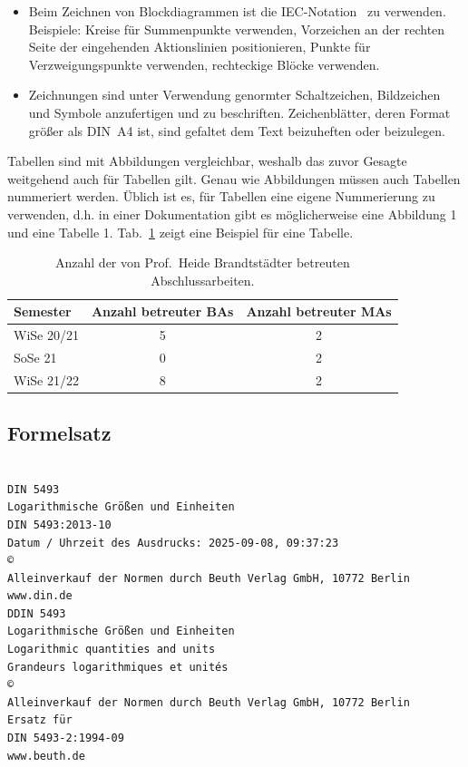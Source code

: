 \begin{itemize}
    \item Beim Zeichnen von Blockdiagrammen ist die IEC-Notation~\cite{IECControltech} zu verwenden. Beispiele: Kreise für Summenpunkte verwenden, Vorzeichen an der rechten Seite der eingehenden Aktionslinien positionieren, Punkte für Verzweigungspunkte verwenden, rechteckige Blöcke verwenden.
    \item Zeichnungen sind unter Verwendung genormter Schaltzeichen, Bildzeichen und Symbole anzufertigen und zu beschriften. Zeichenblätter, deren Format größer als DIN~A4 ist, sind gefaltet dem Text beizuheften oder beizulegen.
\end{itemize}

 
Tabellen sind mit Abbildungen vergleichbar, weshalb das zuvor Gesagte weitgehend auch für Tabellen gilt. Genau wie Abbildungen müssen auch Tabellen nummeriert werden. Üblich ist es, für Tabellen eine eigene Nummerierung zu verwenden, d.h. in einer Dokumentation gibt es möglicherweise eine Abbildung 1 und eine Tabelle 1. Tab.~\ref{tab:BAsMas} zeigt eine Beispiel für eine Tabelle.


\begin{table}[h]
    \centering
   \begin{tabular}{l|c|c}
	Semester   &Anzahl betreuter BAs   & Anzahl betreuter MAs\\
    \hline
    WiSe 20/21     &5      &2\\
    SoSe 21     &0      &2\\
    WiSe 21/22     &8      &2\\
\end{tabular}
	\caption{Anzahl der von Prof.~Heide Brandtstädter betreuten Abschlussarbeiten.}
	\label{tab:BAsMas}
\end{table}


\subsection{Formelsatz }
\label{sec:formulas}

\begin{verbatim}
    
DIN 5493
Logarithmische Größen und Einheiten
DIN 5493:2013-10
Datum / Uhrzeit des Ausdrucks: 2025-09-08, 09:37:23
©
Alleinverkauf der Normen durch Beuth Verlag GmbH, 10772 Berlin
www.din.de
DDIN 5493
Logarithmische Größen und Einheiten
Logarithmic quantities and units
Grandeurs logarithmiques et unités
©
Alleinverkauf der Normen durch Beuth Verlag GmbH, 10772 Berlin
Ersatz für
DIN 5493-2:1994-09
www.beuth.de
\end{verbatim}

